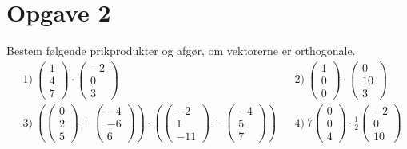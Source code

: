 \section*{Opgave 2}
Bestem følgende prikprodukter og afgør, om vektorerne er orthogonale.
\begin{align*}
	&1) \ 	
	\begin{pmatrix}
		1 \\ 4 \\ 7
	\end{pmatrix} \cdot
	\begin{pmatrix}
		-2 \\ 0 \\ 3
	\end{pmatrix} 
	&&2) \ 	
	\begin{pmatrix}
		1 \\ 0 \\ 0
	\end{pmatrix} \cdot
	\begin{pmatrix}
		0 \\ 10 \\ 3
	\end{pmatrix}
	\\
	&3) \ 
	\left(	
	\begin{pmatrix}
		0 \\ 2 \\ 5
	\end{pmatrix} +
	\begin{pmatrix}
		-4 \\ -6 \\ 6
	\end{pmatrix}
	\right)	
	\cdot 	
	\left(
	\begin{pmatrix}
		-2 \\ 1 \\ -11
	\end{pmatrix}
	+
	\begin{pmatrix}
		-4 \\ 5 \\ 7
	\end{pmatrix}
	\right)
	&&4) \ 	
	7
	\begin{pmatrix}
		0 \\ 0 \\ 4
	\end{pmatrix} 
	\cdot
	\frac{1}{2}
	\begin{pmatrix}
		-2 \\ 0 \\ 10
	\end{pmatrix}
\end{align*}
